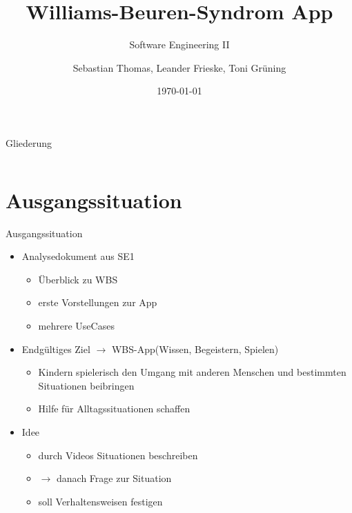 \documentclass[10pt,fleqn]{beamer}
\title[WBS]{Williams-Beuren-Syndrom App}
\subtitle[]{Software Engineering II}
\date{\today}
\author{Sebastian Thomas, Leander Frieske, Toni Grüning}
\begin{document}

\begin{frame}
	\titlepage
\end{frame}

\begin{frame}{Gliederung}
 	\begin{columns}
   		\begin{column}{10.0cm}
		    \renewcommand{\baselinestretch}{1.5}
		    \normalsize
		    \tableofcontents
		    \renewcommand{\baselinestretch}{1.0}
		    \normalsize
	   	\end{column}
	   	\hspace*{-1.3cm}
	\end{columns}
\end{frame}


\section{Ausgangssituation}
\begin{frame}[t]{Ausgangssituation}
	\begin{itemize}
		\item Analysedokument aus SE1
		\begin{itemize}
			\item Überblick zu WBS
			\item erste Vorstellungen zur App
			\item mehrere UseCases
		\end{itemize}
	\item Endgültiges Ziel $\rightarrow$ WBS-App(Wissen, Begeistern, Spielen)
		\begin{itemize}
			\item Kindern spielerisch den Umgang mit anderen Menschen und bestimmten Situationen beibringen
			\item Hilfe für Alltagssituationen schaffen
		\end{itemize}
	\item Idee
		\begin{itemize}
			\item durch Videos Situationen beschreiben
			\item[] $\rightarrow$ danach Frage zur Situation
			\item soll Verhaltensweisen festigen
		\end{itemize}
	\end{itemize}
\end{frame}
\end{document}
